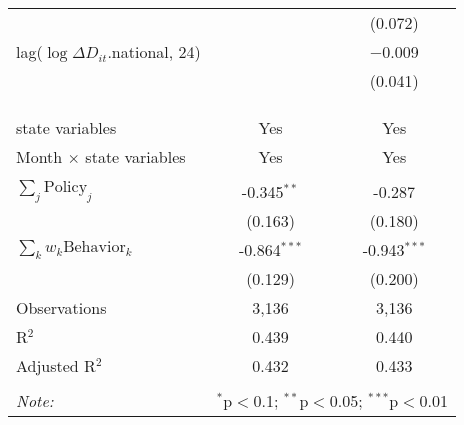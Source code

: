 \begin{tabular}{@{\extracolsep{1pt}}lcc}
  &  & (0.072) \\ 
  lag($\log \Delta D_{it}$.national, 24) &  & $-$0.009 \\ 
  &  & (0.041) \\ 
   &  &  \\ 
  &  &  \\ 
 \hline \\[-1.8ex] 
state variables & Yes & Yes \\ 
Month $\times$ state variables & Yes & Yes \\ 
\hline \\[-1.8ex] 
$\sum_j \mathrm{Policy}_j$ & -0.345$^{**}$ & -0.287 \\ 
 & (0.163) & (0.180) \\ 
$\sum_k w_k \mathrm{Behavior}_k$ & -0.864$^{***}$ & -0.943$^{***}$ \\ 
 & (0.129) & (0.200) \\ 
Observations & 3,136 & 3,136 \\ 
R$^{2}$ & 0.439 & 0.440 \\ 
Adjusted R$^{2}$ & 0.432 & 0.433 \\ 
\hline 
\hline \\[-1.8ex] 
\textit{Note:}  & \multicolumn{2}{r}{$^{*}$p$<$0.1; $^{**}$p$<$0.05; $^{***}$p$<$0.01} \\ 
\end{tabular} 